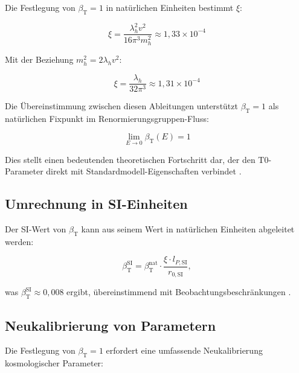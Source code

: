 \documentclass[12pt,a4paper]{article}
\newcommand{\betaT}{\beta_{\text{T}}}
\begin{document}
	Die Festlegung von \(\betaT = 1\) in natürlichen Einheiten bestimmt \(\xi\):
	
	\begin{equation}
		\xi = \frac{\lambda_h^2 v^2}{16 \pi^3 m_h^2} \approx 1,33 \times 10^{-4}
		\label{eq:xi_determination}
	\end{equation}
	
	Mit der Beziehung \(m_h^2 = 2\lambda_h v^2\):
	
	\begin{equation}
		\xi = \frac{\lambda_h}{32 \pi^3} \approx 1,31 \times 10^{-4}
		\label{eq:xi_simplified}
	\end{equation}
	
	Die Übereinstimmung zwischen diesen Ableitungen unterstützt \(\betaT = 1\) als natürlichen Fixpunkt im Renormierungsgruppen-Fluss:
	
	\begin{equation}
		\lim_{E \to 0} \betaT(E) = 1
		\label{eq:beta_fixed_point}
	\end{equation}
	
	Dies stellt einen bedeutenden theoretischen Fortschritt dar, der den T0-Parameter direkt mit Standardmodell-Eigenschaften verbindet \cite{pascher_alphabeta_2025}.
	
	\subsection{Umrechnung in SI-Einheiten}
	\label{subsec:conversion_si}
	
	Der SI-Wert von \(\betaT\) kann aus seinem Wert in natürlichen Einheiten abgeleitet werden:
	
	\begin{equation}
		\betaT^{\text{SI}} = \betaT^{\text{nat}} \cdot \frac{\xi \cdot l_{P,\text{SI}}}{r_{0,\text{SI}}},
		\label{eq:beta_conversion}
	\end{equation}
	
	was \(\betaT^{\text{SI}} \approx 0,008\) ergibt, übereinstimmend mit Beobachtungsbeschränkungen \cite{pascher_alphabeta_2025}.
	
	\subsection{Neukalibrierung von Parametern}
	\label{subsec:recalibration}
	
	Die Festlegung von \(\betaT = 1\) erfordert eine umfassende Neukalibrierung kosmologischer Parameter:
	
\end{document}
